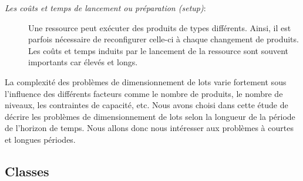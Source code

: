 \documentclass[12pt,a4paper]{article}
\begin{document}
\begin{description}
	\item[\textsl{Les coûts et temps de lancement ou préparation (setup)}:] Une ressource peut exécuter des produits de types différents. Ainsi, il est parfois nécessaire de reconfigurer celle-ci à chaque changement de produits. Les coûts et temps induits par le lancement de la ressource sont souvent importants car
élevés et longs.
	
\end{description}

	La complexité des problèmes de dimensionnement de lots varie fortement sous l'influence des différents facteurs comme le nombre de produits, le nombre de niveaux, les contraintes de capacité, etc. Nous avons choisi dans cette étude de décrire les problèmes de dimensionnement de lots selon la longueur de la période de l'horizon de temps. Nous allons donc nous intéresser aux problèmes à courtes et longues périodes.
\subsection{Classes}
\end{document}
